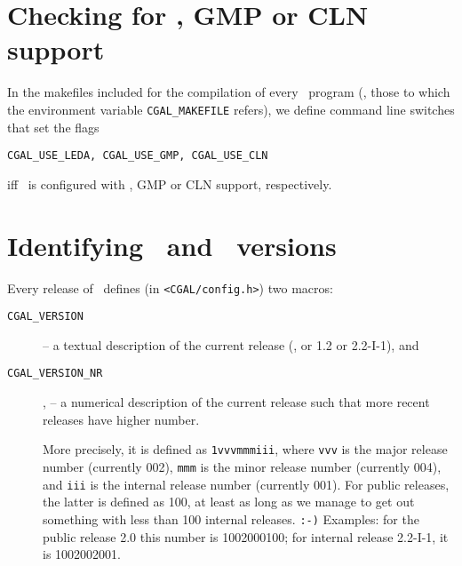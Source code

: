 \section{Checking for \leda, GMP or CLN support}
\label{sec:leda_gmp_cln_support}

In the makefiles included for the compilation of every \cgal\ program
(\ie, those to which the environment variable {\tt CGAL\_MAKEFILE} refers),
we define command line switches that set the flags 
\begin{verbatim}
CGAL_USE_LEDA, CGAL_USE_GMP, CGAL_USE_CLN
\end{verbatim}
iff \cgal\ is configured with \leda, GMP or CLN support, respectively.

\section{Identifying \cgal\ and \leda\ versions}
\label{sec:which_versions}

Every release of \cgal\ defines (in \texttt{<CGAL/config.h>}) two
macros:
\begin{description}
\item[\texttt{CGAL\_VERSION}]
     -- a textual description of the
     current release (\eg, or 1.2 or 2.2-I-1), and 
\item[\texttt{CGAL\_VERSION\_NR}], 
     --  a numerical description of
     the current release such that more recent releases have higher
     number.

     More precisely, it is defined as \texttt{1vvvmmmiii},
     where \texttt{vvv} is the major release number (currently 002),
     \texttt{mmm} is the minor release number (currently 004), and
     \texttt{iii} is the internal release number (currently 001). For
     public releases, the latter is defined as 100, at least as long as we
     manage to get out something with less than 100 internal releases.
     \texttt{:-)} Examples: for the public release 2.0 this number is 
     1002000100; for internal release 2.2-I-1, it is 1002002001.
\end{description}
 
